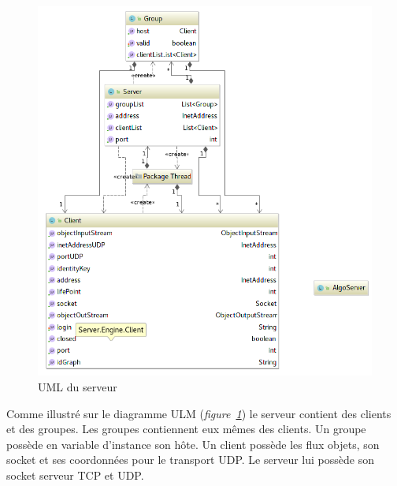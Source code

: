 \documentclass[a4paper,11pt]{report}
\begin{document}
    \begin{figure}[th]
      \begin{center}
        \includegraphics[scale=0.3]{Assets/UML_serveur.png}
        \caption{UML du serveur}
        \label{UML du serveur}
      \end{center}
    \end{figure}
    
    
    Comme illustré sur le diagramme ULM (\textit{figure~\ref{UML du serveur}}) le serveur contient des clients et des groupes. Les groupes contiennent eux mêmes des clients. Un groupe possède en variable d’instance son hôte. Un client possède les flux objets, son socket et ses coordonnées pour le transport UDP. Le serveur lui possède son socket serveur TCP et UDP.
\end{document}
